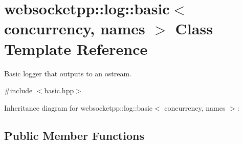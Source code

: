 \hypertarget{classwebsocketpp_1_1log_1_1basic}{}\section{websocketpp\+:\+:log\+:\+:basic$<$ concurrency, names $>$ Class Template Reference}
\label{classwebsocketpp_1_1log_1_1basic}


Basic logger that outputs to an ostream.  




{\ttfamily \#include $<$basic.\+hpp$>$}



Inheritance diagram for websocketpp\+:\+:log\+:\+:basic$<$ concurrency, names $>$\+:
\subsection*{Public Member Functions}
